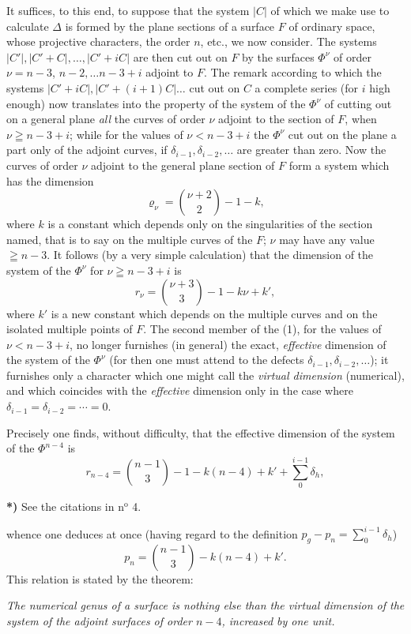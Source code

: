 \documentclass{article}
\begin{document}
It suffices, to this end, to suppose that the system $|C|$ of which we make use to calculate $\Delta$ is formed by the plane sections of a surface $F$ of ordinary space, whose projective characters, the order $n$, etc., we now consider. The systems $|C'|, |C'+C|, \ldots, |C'+iC|$ are then cut out on $F$ by the surfaces $\Phi^{\nu}$ of order $\nu = n-3$, $n-2, \ldots n-3+i$ adjoint to $F$. The remark according to which the systems $|C'+iC|, |C'+(i+1)C| \ldots$ cut out on $C$ a complete series (for $i$ high enough) now translates into the property of the system of the $\Phi^{\nu}$ of cutting out on a general plane \emph{all} the curves of order $\nu$ adjoint to the section of $F$, when $\nu \geqq n-3+i$; while for the values of $\nu < n-3+i$ the $\Phi^{\nu}$ cut out on the plane a part only of the adjoint curves, if $\delta_{i-1}, \delta_{i-2}, \ldots$ are greater than zero. Now the curves of order $\nu$ adjoint to the general plane section of $F$ form a system which has the dimension
\[
\varrho_{\nu} = \binom{\nu+2}{2} - 1 - k,
\]
where $k$ is a constant which depends only on the singularities of the section named, that is to say on the multiple curves of the $F$; $\nu$ may have any value $\geqq n-3$. It follows (by a very simple calculation) that the dimension of the system of the $\Phi^{\nu}$ for $\nu \geqq n-3+i$ is
\[
r_{\nu} = \binom{\nu+3}{3} - 1 - k\nu + k', \tag{1}
\]
where $k'$ is a new constant which depends on the multiple curves and on the isolated multiple points of $F$. The second member of the (1), for the values of $\nu < n-3+i$, no longer furnishes (in general) the exact, \emph{effective} dimension of the system of the $\Phi^{\nu}$ (for then one must attend to the defects $\delta_{i-1}, \delta_{i-2}, \ldots$); it furnishes only a character which one might call the \emph{virtual dimension} (numerical), and which coincides with the \emph{effective} dimension only in the case where $\delta_{i-1} = \delta_{i-2} = \cdots = 0$.

Precisely one finds, without difficulty, that the effective dimension of the system of the $\Phi^{n-4}$ is
\[
r_{n-4} = \binom{n-1}{3} - 1 - k(n-4) + k' + \sum_{0}^{i-1} \delta_{h},
\]

\textbf{*)} See the citations in n${}^{\text{o}}$ 4.

whence one deduces at once (having regard to the definition $\displaystyle p_{g} - p_{n} = \sum_{0}^{i-1} \delta_{h}$)
\[
p_{n} = \binom{n-1}{3} - k(n-4) + k'.
\]
This relation is stated by the theorem:

\emph{The numerical genus of a surface is nothing else than the virtual dimension of the system of the adjoint surfaces of order $n-4$, increased by one unit.}
\end{document}
